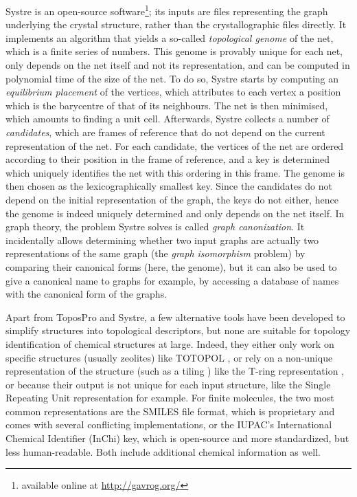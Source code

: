 \documentclass[main.tex]{subfiles}
\begin{document}
Systre is an open-source software\footnote{available online at \url{http://gavrog.org/}}; its inputs are files representing the graph underlying the crystal structure, rather than the crystallographic files directly. It implements an algorithm that yields a so-called \emph{topological genome} \autocite{genome} of the net, which is a finite series of numbers. This genome is provably unique for each net, only depends on the net itself and not its representation, and can be computed in polynomial time of the size of the net. To do so, Systre starts by computing an \emph{equilibrium placement} \autocite{barycentric} of the vertices, which attributes to each vertex a position which is the barycentre of that of its neighbours. The net is then minimised, which amounts to finding a unit cell. Afterwards, Systre collects a number of \emph{candidates}, which are frames of reference that do not depend on the current representation of the net. For each candidate, the vertices of the net are ordered according to their position in the frame of reference, and a key is determined which uniquely identifies the net with this ordering in this frame. The genome is then chosen as the lexicographically smallest key. Since the candidates do not depend on the initial representation of the graph, the keys do not either, hence the genome is indeed uniquely determined and only depends on the net itself. In graph theory, the problem Systre solves is called \textit{graph canonization}. It incidentally allows determining whether two input graphs are actually two representations of the same graph (the \textit{graph isomorphism} problem) by comparing their canonical forms (here, the genome), but it can also be used to give a canonical name to graphs for example, by accessing a database of names with the canonical form of the graphs.

Apart from ToposPro and Systre, a few alternative tools have been developed to simplify structures into topological descriptors, but none are suitable for topology identification of chemical structures at large. Indeed, they either only work on specific structures (usually zeolites) like TOTOPOL \autocite{Totopol}, or rely on a non-unique representation of the structure (such as a tiling \autocite{Tiling}) like the T-ring representation \autocite{ChemicalHieroglyphs}, or because their output is not unique for each input structure, like the Single Repeating Unit representation \autocite{GandhiGraphTheoreticRepresentation} for example. For finite molecules, the two most common representations are the SMILES \autocite{SMILES} file format, which is proprietary and comes with several conflicting implementations, or the IUPAC's International Chemical Identifier (InChi) \autocite{InChi} key, which is open-source and more standardized, but less human-readable. Both include additional chemical information as well.
\end{document}
